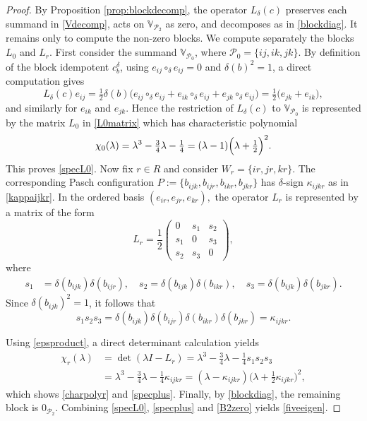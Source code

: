 \documentclass[10pt,a4paper]{amsart}
\numberwithin{equation}{section}
\def\valg{\mathbb{V}}
\begin{document}
\begin{proof}
By Proposition \ref{prop:blockdecomp}, the operator $L_\delta(c)$ preserves each summand in \eqref{Vdecomp}, acts on $\valg_{\mathcal{P}_2}$ as zero, and decomposes as in \eqref{blockdiag}. It remains only to compute the non-zero blocks. We compute separately the blocks $L_0$ and $L_r$.
First consider the summand $\valg_{\mathcal{P}_0}$, where $\mathcal{P}_0=\{ij,ik,jk\}$.
By definition of the block idempotent $c_b^\delta$, using $e_{ij}\circ_\delta e_{ij}=0$ and $\delta(b)^2=1$, a direct computation gives
$$
L_\delta(c)e_{ij}
=
\tfrac12\delta(b)\bigl(e_{ij}\circ_\delta e_{ij}+e_{ik}\circ_\delta e_{ij}+e_{jk}\circ_\delta e_{ij}\bigr)
=
\tfrac12\bigl(e_{jk}+e_{ik}\bigr),
$$
and similarly for $e_{ik}$ and $e_{jk}$. Hence the restriction of $L_\delta(c)$ to $\valg_{\mathcal{P}_0}$ is represented by the matrix $L_{0}$ in \eqref{L0matrix} which has characteristic polynomial
$$
\chi_0(\lambda)
=
\lambda^3-\tfrac34\lambda-\tfrac14 =
(\lambda-1)\Bigl(\lambda+\tfrac12\Bigr)^2.
$$
This proves \eqref{specL0}.
Now fix $r\in R$ and consider $W_r=\{ir,jr,kr\}$. The corresponding Pasch configuration $
P:=\{b_{ijk},
b_{ijr},
b_{ikr},
b_{jkr}\}
$ has $\delta$-sign $\kappa_{ijkr}$ as in \eqref{kappaijkr}.
In the ordered basis $(e_{ir},e_{jr},e_{kr}),$
the operator $L_r$ is represented by a matrix of the form
$$
L_r
=
\frac12
\begin{pmatrix}
0&s_1&s_2\\
s_1&0&s_3\\
s_2&s_3&0
\end{pmatrix},
$$
where
\begin{align}
s_1&=\delta(b_{ijk})\delta(b_{ijr}),
\quad
s_2=\delta(b_{ijk})\delta(b_{ikr}),
\quad
s_3=\delta(b_{ijk})\delta(b_{jkr}).
\label{eps3}
\end{align}
Since $\delta(b_{ijk})^2=1$, it follows that
\begin{equation}\label{epsproduct}
s_1s_2s_3
=
\delta(b_{ijk})
\delta(b_{ijr})
\delta(b_{ikr})
\delta(b_{jkr})
=
\kappa_{ijkr}.
\end{equation}


Using \eqref{epsproduct}, a  direct determinant calculation yields
$$
\begin{aligned}
\chi_r(\lambda)&=\det(\lambda I-L_r) =\lambda^3-\tfrac34\lambda-\tfrac14 s_1s_2s_3
\\&= \lambda^3-\tfrac34\lambda-\tfrac14\kappa_{ijkr}  = (\lambda-\kappa_{ijkr})\bigl(\lambda+\tfrac12 \kappa_{ijkr}\bigr)^2,
\end{aligned}
$$
which shows \eqref{charpolyr} and \eqref{specplus}.
Finally, by \eqref{blockdiag}, the remaining block is $0_{\mathcal{P}_2}$. Combining \eqref{specL0}, \eqref{specplus} and \eqref{B2zero} yields \eqref{fiveeigen}.
\end{proof}
\end{document}
